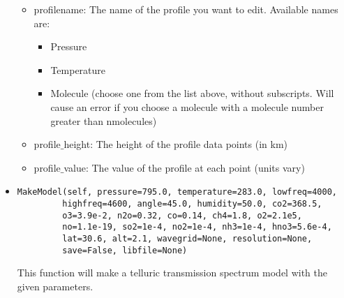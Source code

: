 \documentclass{article}
\begin{document}
\begin{itemize}
  \begin{itemize}
  \item profilename: The name of the profile you want to edit. Available names are:
  \begin{itemize}
    \item Pressure
    \item Temperature
    \item Molecule (choose one from the list above, without subscripts. Will cause an error if you choose a molecule with a molecule number greater than nmolecules)
  \end{itemize}
  \item profile$\_$height: The height of the profile data points (in km)
  \item profile$\_$value: The value of the profile at each point (units vary)
  \end{itemize}
  
  \item \begin{Verbatim}[commandchars=\\\{\}]
MakeModel(self, pressure=795.0, temperature=283.0, lowfreq=4000,
         highfreq=4600, angle=45.0, humidity=50.0, co2=368.5,
         o3=3.9e-2, n2o=0.32, co=0.14, ch4=1.8, o2=2.1e5, 
         no=1.1e-19, so2=1e-4, no2=1e-4, nh3=1e-4, hno3=5.6e-4,
         lat=30.6, alt=2.1, wavegrid=None, resolution=None, 
         save=False, libfile=None)
    \end{Verbatim}
   This function will make a telluric transmission spectrum model with the given parameters.
   
   \begin{itemize}
     

\end{itemize}
\end{itemize}
\end{document}
